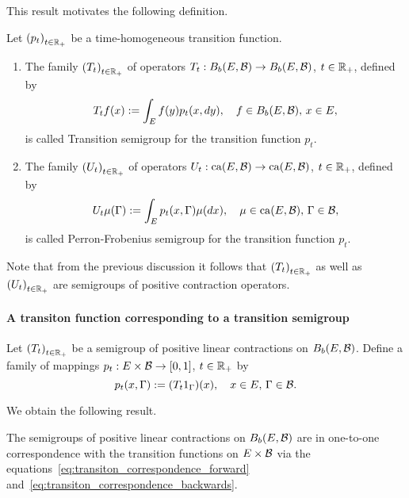 \documentclass[../Master.tex]{subfiles}
\begin{document}
This result motivates the following definition.

\begin{definition}
  Let \({(p_t)}_{t \in \mathbb{R}_+}\) be a time-homogeneous transition function.
  \begin{enumerate}[label = (\roman*)]
    \item The family \({(T_t)}_{t \in \mathbb{R}_+} \) of operators \(T_t: B_b (E,\mathcal{B}) \to B_b (E,\mathcal{B}) \), \(t \in \mathbb{R}_+ \), defined by
    \begin{equation}\label{eq:transiton_correspondence_forward}
      T_t f(x) := \int_E f(y) p_t (x, dy), \quad f \in B_{b} (E,\mathcal{B}), \, x \in E,
    \end{equation}
    is called Transition semigroup for the transition function \(p_t\).
    \item The family \({(U_t)}_{t \in \mathbb{R}_+} \) of operators \(U_t: \mathrm{ca} (E,\mathcal{B}) \to \mathrm{ca} (E,\mathcal{B})\), \(t \in \mathbb{R}_+ \), defined by
    \begin{equation}\label{eq:perron_frobenius_correspondence_forward}
      U_t \mu(\Gamma) := \int_E p_t (x, \Gamma) \mu(dx) , \quad \mu \in \mathrm{ca} (E,\mathcal{B}), \, \Gamma \in \mathcal{B},
    \end{equation}
    is called Perron-Frobenius semigroup for the transition function \(p_t\).
  \end{enumerate}
\end{definition}

Note that from the previous discussion it follows that \({(T_t)}_{t \in \mathbb{R}_+}\) as well as \({(U_t)}_{t \in \mathbb{R}_+}\) are semigroups of positive contraction operators.


\paragraph{A transiton function corresponding to a transition semigroup}
Let \({(T_t)}_{t \in \mathbb{R}_+}\) be a semigroup of positive linear contractions on \(B_b(E,\mathcal{B})\). Define a family of mappings \(p_t: E \times \mathcal{B} \to [0,1]\), \(t \in \mathbb{R}_+\) by
\begin{equation}\label{eq:transiton_correspondence_backwards}
  p_t(x, \Gamma) := (T_t 1_{\Gamma})(x), \quad x \in E, \, \Gamma \in \mathcal{B}.
\end{equation}

We obtain the following result.
\begin{proposition}\label{prop:one_to_one_correspondence}
  The semigroups of positive linear contractions on \(B_b(E,\mathcal{B})\) are in one-to-one correspondence with the transition functions on \(E \times \mathcal{B}\) via the equations~\eqref{eq:transiton_correspondence_forward} and~\eqref{eq:transiton_correspondence_backwards}.
\end{proposition}
\end{document}
